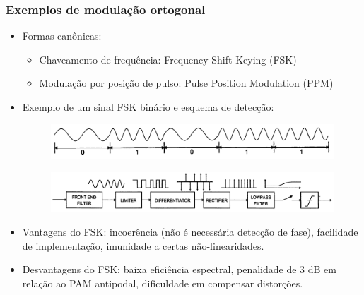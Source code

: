 \begin{frame}
	\frametitle{Exemplos de modulação ortogonal}

	\begin{itemize}
	    \item Formas canônicas:
	    \begin{itemize}
	     \item Chaveamento de frequência: Frequency Shift Keying (FSK)
	     \item Modulação por posição de pulso: Pulse Position Modulation (PPM)
	    \end{itemize}
	    \item Exemplo de um sinal FSK binário e esquema de detecção:
	    \begin{figure}[t]	
		\begin{center}
		\includegraphics[width=0.75\columnwidth]{figs/adv_09}
		\end{center}
	    \end{figure}
	    \begin{figure}[t]	
		\begin{center}
		\includegraphics[width=0.75\columnwidth]{figs/adv_10}
		\end{center}
	    \end{figure}	    
	    \item Vantagens do FSK: incoerência (não é necessária detecção de fase), facilidade de implementação, imunidade a certas não-linearidades.
	    \item Desvantagens do FSK: baixa eficiência espectral, penalidade de 3 dB em relação ao PAM antipodal, dificuldade em compensar distorções.
	\end{itemize}	
\end{frame}

